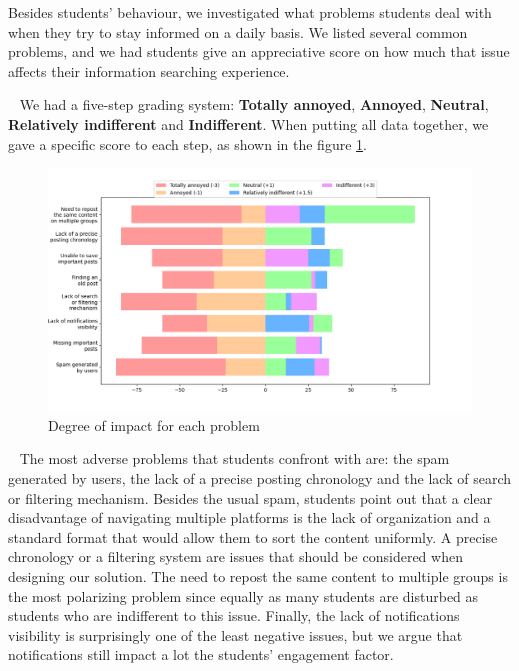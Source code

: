 Besides students' behaviour, we investigated what problems students deal with when they try to stay informed on a daily basis. We listed several common problems, and we had students give an appreciative score on how much that issue affects their information searching experience.

~
We had a five-step grading system: \textbf{Totally annoyed}, \textbf{Annoyed}, \textbf{Neutral}, \textbf{Relatively indifferent} and \textbf{Indifferent}. When putting all data together, we gave a specific score to each step, as shown in the figure \ref{3:fig:student_problems}.

\begin{figure}[ht]
    \centering
         \includegraphics[height=0.42\textheight]{figures/charts/survey/survey-study-problems-stacked.png}
    \caption{Degree of impact for each problem}
    \label{3:fig:student_problems}
\end{figure}

~
The most adverse problems that students confront with are: the spam generated by users, the lack of a precise posting chronology and the lack of search or filtering mechanism.
Besides the usual spam, students point out that a clear disadvantage of navigating multiple platforms is the lack of organization and a standard format that would allow them to sort the content uniformly. A precise chronology or a filtering system are issues that should be considered when designing our solution.
The need to repost the same content to multiple groups is the most polarizing problem since equally as many students are disturbed as students who are indifferent to this issue. Finally, the lack of notifications visibility is surprisingly one of the least negative issues, but we argue that notifications still impact a lot the students' engagement factor.

